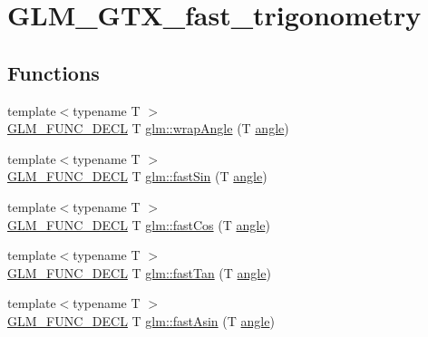 \hypertarget{group__gtx__fast__trigonometry}{}\section{G\+L\+M\+\_\+\+G\+T\+X\+\_\+fast\+\_\+trigonometry}
\label{group__gtx__fast__trigonometry}
\subsection*{Functions}
\begin{DoxyCompactItemize}
\item 
{\footnotesize template$<$typename T $>$ }\\\mbox{\hyperlink{setup_8hpp_ab2d052de21a70539923e9bcbf6e83a51}{G\+L\+M\+\_\+\+F\+U\+N\+C\+\_\+\+D\+E\+CL}} T \mbox{\hyperlink{group__gtx__fast__trigonometry_ga069527c6dbd64f53435b8ebc4878b473}{glm\+::wrap\+Angle}} (T \mbox{\hyperlink{_s_d_l__opengl__glext_8h_a9e06c1f76a20fed54ca742cd25cb02c4}{angle}})
\item 
{\footnotesize template$<$typename T $>$ }\\\mbox{\hyperlink{setup_8hpp_ab2d052de21a70539923e9bcbf6e83a51}{G\+L\+M\+\_\+\+F\+U\+N\+C\+\_\+\+D\+E\+CL}} T \mbox{\hyperlink{group__gtx__fast__trigonometry_ga0aab3257bb3b628d10a1e0483e2c6915}{glm\+::fast\+Sin}} (T \mbox{\hyperlink{_s_d_l__opengl__glext_8h_a9e06c1f76a20fed54ca742cd25cb02c4}{angle}})
\item 
{\footnotesize template$<$typename T $>$ }\\\mbox{\hyperlink{setup_8hpp_ab2d052de21a70539923e9bcbf6e83a51}{G\+L\+M\+\_\+\+F\+U\+N\+C\+\_\+\+D\+E\+CL}} T \mbox{\hyperlink{group__gtx__fast__trigonometry_gab34c8b45c23c0165a64dcecfcc3b302a}{glm\+::fast\+Cos}} (T \mbox{\hyperlink{_s_d_l__opengl__glext_8h_a9e06c1f76a20fed54ca742cd25cb02c4}{angle}})
\item 
{\footnotesize template$<$typename T $>$ }\\\mbox{\hyperlink{setup_8hpp_ab2d052de21a70539923e9bcbf6e83a51}{G\+L\+M\+\_\+\+F\+U\+N\+C\+\_\+\+D\+E\+CL}} T \mbox{\hyperlink{group__gtx__fast__trigonometry_gaf29b9c1101a10007b4f79ee89df27ba2}{glm\+::fast\+Tan}} (T \mbox{\hyperlink{_s_d_l__opengl__glext_8h_a9e06c1f76a20fed54ca742cd25cb02c4}{angle}})
\item 
{\footnotesize template$<$typename T $>$ }\\\mbox{\hyperlink{setup_8hpp_ab2d052de21a70539923e9bcbf6e83a51}{G\+L\+M\+\_\+\+F\+U\+N\+C\+\_\+\+D\+E\+CL}} T \mbox{\hyperlink{group__gtx__fast__trigonometry_ga562cb62c51fbfe7fac7db0bce706b81f}{glm\+::fast\+Asin}} (T \mbox{\hyperlink{_s_d_l__opengl__glext_8h_a9e06c1f76a20fed54ca742cd25cb02c4}{angle}})

\end{DoxyCompactItemize}
